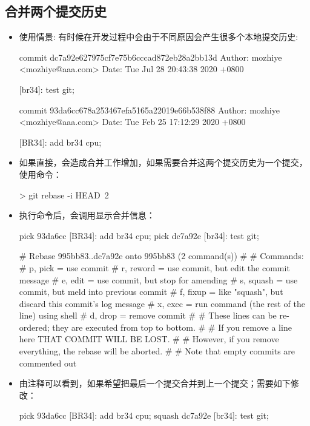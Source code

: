 \subsection{合并两个提交历史}
\begin{itemize}
\item 使用情景: 有时候在开发过程中会由于不同原因会产生很多个本地提交历史:
\begin{messagebox}
commit dc7a92e627975cf7e75b6cccad872eb28a2bb13d
Author: mozhiye <mozhiye@aaa.com>
Date:   Tue Jul 28 20:43:38 2020 +0800

    [br34]: test git;

commit 93da6cc678a253467efa5165a22019e66b538f88
Author: mozhiye <mozhiye@aaa.com>
Date:   Tue Feb 25 17:12:29 2020 +0800

    [BR34]: add br34 cpu;
\end{messagebox}

\item 如果直接，会造成合并工作增加，如果需要合并这两个提交历史为一个提交， 使用命令：
\begin{commandbox}
 > git rebase -i HEAD~2
\end{commandbox}

\item 执行命令后，会调用显示合并信息：

\begin{messagebox}
pick 93da6cc [BR34]: add br34 cpu;
pick dc7a92e [br34]: test git;

# Rebase 995bb83..dc7a92e onto 995bb83 (2 command(s))
#
# Commands:
# p, pick = use commit
# r, reword = use commit, but edit the commit message
# e, edit = use commit, but stop for amending
# s, squash = use commit, but meld into previous commit
# f, fixup = like "squash", but discard this commit's log message
# x, exec = run command (the rest of the line) using shell
# d, drop = remove commit
#
# These lines can be re-ordered; they are executed from top to bottom.
#
# If you remove a line here THAT COMMIT WILL BE LOST.
#
# However, if you remove everything, the rebase will be aborted.
#
# Note that empty commits are commented out
\end{messagebox}

\item 由注释可以看到，如果希望把最后一个提交合并到上一个提交；需要如下修改：
\begin{messagebox}
pick 93da6cc [BR34]: add br34 cpu;
squash dc7a92e [br34]: test git;
\end{messagebox}


\end{itemize}

